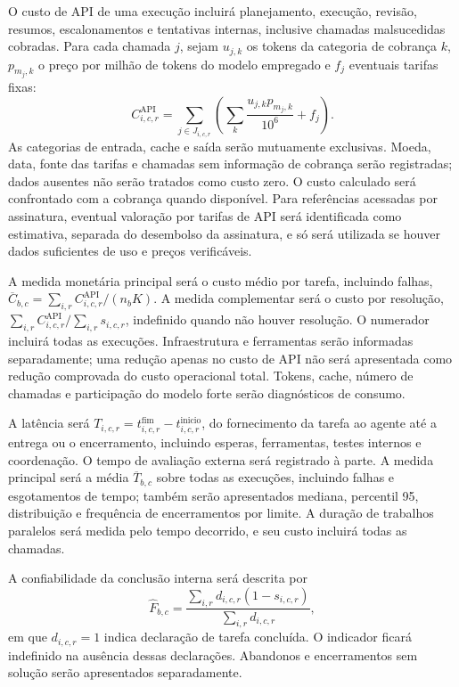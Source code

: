 O custo de API de uma execução incluirá planejamento, execução, revisão, resumos, escalonamentos e tentativas internas, inclusive chamadas malsucedidas cobradas. Para cada chamada $j$, sejam $u_{j,k}$ os tokens da categoria de cobrança $k$, $p_{m_j,k}$ o preço por milhão de tokens do modelo empregado e $f_j$ eventuais tarifas fixas:
\begin{equation}
C^{\mathrm{API}}_{i,c,r}=\sum_{j\in J_{i,c,r}}\left(\sum_k\frac{u_{j,k}p_{m_j,k}}{10^6}+f_j\right).
\end{equation}
As categorias de entrada, cache e saída serão mutuamente exclusivas. Moeda, data, fonte das tarifas e chamadas sem informação de cobrança serão registradas; dados ausentes não serão tratados como custo zero. O custo calculado será confrontado com a cobrança quando disponível. Para referências acessadas por assinatura, eventual valoração por tarifas de API será identificada como estimativa, separada do desembolso da assinatura, e só será utilizada se houver dados suficientes de uso e preços verificáveis.

A medida monetária principal será o custo médio por tarefa, incluindo falhas, $\overline{C}_{b,c}=\sum_{i,r}C^{\mathrm{API}}_{i,c,r}/(n_bK)$. A medida complementar será o custo por resolução, $\sum_{i,r}C^{\mathrm{API}}_{i,c,r}/\sum_{i,r}s_{i,c,r}$, indefinido quando não houver resolução. O numerador incluirá todas as execuções. Infraestrutura e ferramentas serão informadas separadamente; uma redução apenas no custo de API não será apresentada como redução comprovada do custo operacional total. Tokens, cache, número de chamadas e participação do modelo forte serão diagnósticos de consumo.

A latência será $T_{i,c,r}=t^{\mathrm{fim}}_{i,c,r}-t^{\mathrm{inicio}}_{i,c,r}$, do fornecimento da tarefa ao agente até a entrega ou o encerramento, incluindo esperas, ferramentas, testes internos e coordenação. O tempo de avaliação externa será registrado à parte. A medida principal será a média $\overline{T}_{b,c}$ sobre todas as execuções, incluindo falhas e esgotamentos de tempo; também serão apresentados mediana, percentil 95, distribuição e frequência de encerramentos por limite. A duração de trabalhos paralelos será medida pelo tempo decorrido, e seu custo incluirá todas as chamadas.

A confiabilidade da conclusão interna será descrita por
\begin{equation}
\widehat{F}_{b,c}=\frac{\sum_{i,r}d_{i,c,r}(1-s_{i,c,r})}{\sum_{i,r}d_{i,c,r}},
\end{equation}
em que $d_{i,c,r}=1$ indica declaração de tarefa concluída. O indicador ficará indefinido na ausência dessas declarações. Abandonos e encerramentos sem solução serão apresentados separadamente.

